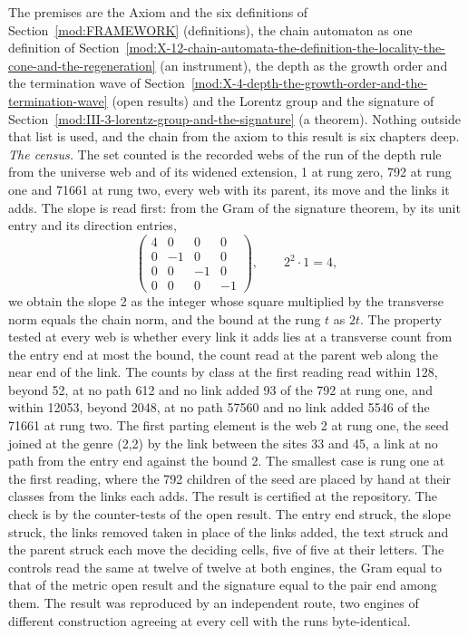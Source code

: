 \begin{chproof}[census]
The premises are the Axiom and the six definitions of Section~\ref{mod:FRAMEWORK} (definitions), the chain automaton as one definition of Section~\ref{mod:X-12-chain-automata-the-definition-the-locality-the-cone-and-the-regeneration} (an instrument), the depth as the growth order and the termination wave of Section~\ref{mod:X-4-depth-the-growth-order-and-the-termination-wave} (open results) and the Lorentz group and the signature of Section~\ref{mod:III-3-lorentz-group-and-the-signature} (a theorem). Nothing outside that list is used, and the chain from the axiom to this result is six chapters deep.
\textit{The census.} The set counted is the recorded webs of the run of the depth rule from the universe web and of its widened extension, 1 at rung zero, 792 at rung one and 71661 at rung two, every web with its parent, its move and the links it adds. The slope is read first: from the Gram of the signature theorem, by its unit entry and its direction entries,
\begin{equation}
\begin{pmatrix} 4 & 0 & 0 & 0 \\ 0 & -1 & 0 & 0 \\ 0 & 0 & -1 & 0 \\ 0 & 0 & 0 & -1 \end{pmatrix},\qquad 2^{2}\cdot 1 = 4,
\end{equation}
we obtain the slope 2 as the integer whose square multiplied by the transverse norm equals the chain norm, and the bound at the rung $t$ as $2t$. The property tested at every web is whether every link it adds lies at a transverse count from the entry end at most the bound, the count read at the parent web along the near end of the link. The counts by class at the first reading read within 128, beyond 52, at no path 612 and no link added 93 of the 792 at rung one, and within 12053, beyond 2048, at no path 57560 and no link added 5546 of the 71661 at rung two. The first parting element is the web 2 at rung one, the seed joined at the genre (2,2) by the link between the sites 33 and 45, a link at no path from the entry end against the bound 2. The smallest case is rung one at the first reading, where the 792 children of the seed are placed by hand at their classes from the links each adds. The result is certified at the repository.
The check is by the counter-tests of the open result. The entry end struck, the slope struck, the links removed taken in place of the links added, the text struck and the parent struck each move the deciding cells, five of five at their letters. The controls read the same at twelve of twelve at both engines, the Gram equal to that of the metric open result and the signature equal to the pair end among them.
The result was reproduced by an independent route, two engines of different construction agreeing at every cell with the runs byte-identical.
\end{chproof}

